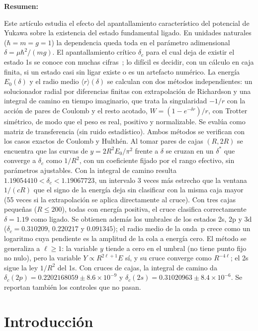 \documentclass[10pt,letterpaper]{article}
\newcommand{\dc}{\delta_c}
\newcommand{\mr}{\langle r\rangle}
\newcommand{\ee}[2]{#1\times10^{#2}}
\newcommand{\hb}{\hbar}
\begin{document}
\noindent\textsf{\textbf{Resumen:}} {\small Este artículo estudia el efecto del apantallamiento característico del potencial de Yukawa sobre la existencia del estado fundamental ligado. En unidades naturales ($\hb=m=g=1$) la dependencia queda toda en el parámetro adimensional $\delta=\mu\hb^2/(mg)$. El apantallamiento crítico $\dc$ para el cual deja de existir el estado 1s se conoce con muchas cifras~\cite{Rogers1970,Gebremedhin2023}; lo difícil es decidir, con un cálculo en caja finita, si un estado casi sin ligar existe o es un artefacto numérico. La energía $E_0(\delta)$ y el radio medio $\mr(\delta)$ se calculan con dos métodos independientes: un solucionador radial por diferencias finitas con extrapolación de Richardson y una integral de camino en tiempo imaginario, que trata la singularidad $-1/r$ con la acción de pares de Coulomb y el resto acotado, $W=(1-e^{-\delta r})/r$, con Trotter simétrico, de modo que el peso es real, positivo y normalizable. Se evalúa como matriz de transferencia (sin ruido estadístico). Ambos métodos se verifican con los casos exactos de Coulomb y Hulthén. Al tomar pares de cajas $(R,2R)$ se encuentra que las curvas de $y=2R^2E_0/\pi^2$ frente a $\delta$ se cruzan en un $\delta^*$ que converge a $\dc$ como $1/R^2$, con un coeficiente fijado por el rango efectivo, sin parámetros ajustables. Con la integral de camino resulta $1.19054410<\dc<1.19067723$, un intervalo 3 veces más estrecho que la ventana $1/(cR)$ que el signo de la energía deja sin clasificar con la misma caja mayor (55 veces si la extrapolación se aplica directamente al cruce). Con tres cajas pequeñas ($R\le200$), todas con energía positiva, el cruce clasifica correctamente $\delta=1.19$ como ligado. Se obtienen además los umbrales de los estados 2s, 2p y 3d ($\dc=0.310209$, $0.220217$ y $0.091345$); el radio medio de la onda~p crece como un logaritmo cuya pendiente es la amplitud de la cola a energía cero. El método se generaliza a $\ell\ge1$: la variable $y$ tiende a cero en el umbral (no tiene punto fijo no nulo), pero la variable $Y\propto R^{2\ell+1}E$ sí, y su cruce converge como $R^{-4\ell}$; el 2s sigue la ley $1/R^2$ del 1s. Con cruces de cajas, la integral de camino da $\dc(2p)=0.2202168059\pm\ee{8.6}{-9}$ y $\dc(2s)=0.31020963\pm\ee{8.4}{-6}$. Se reportan también los controles que no pasan.\par}

\section{Introducción}
\end{document}

